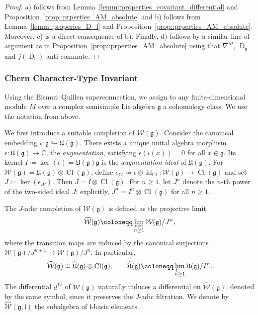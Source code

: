 \documentclass[11pt]{amsart}
\newcommand{\id}{\operatorname{id}}
\newcommand{\Dirac}{\operatorname{D}}
\def\WW{{\mathcal{W}}}
\def\Weil{{\mathcal{W}(\gg)}}
\def\CC{{\mathbb C}}
\def\Cl{{\operatorname{Cl}}}
\def\ll{{\mathfrak l}}
\def\gg{{\mathfrak{g}}}
\def\UE{{\mathfrak U}}
\theoremstyle{plain}
\theoremstyle{remark}
\theoremstyle{definition}
\numberwithin{equation}{section}
\theoremstyle{remark}
\begin{document}
\begin{proof}
 a) follows from Lemma~\ref{lemm::properties_covariant_differential} and Proposition~\ref{prop::prperties_AM_absolute} and b) follows from Lemma~\ref{lemm::properies_D_l} and Proposition~\ref{prop::prperties_AM_absolute}. Moreover, c) is a direct consequence of b). Finally, d) follows by a similar line of argument as in Proposition~\ref{prop::prperties_AM_absolute} using that $\nabla^{M}$, $\Dirac_{\gg}$ and $j(\Dirac_{\ll})$ anti-commute. 
\end{proof}

\subsubsection{Chern Character-Type Invariant} Using the Bismut--Quillen superconnection, we assign to any finite-dimensional module $M$ over a complex semisimple Lie algebra $\gg$ a cohomology class. We use the notation from above.


We first introduce a suitable completion of $\Weil$. Consider the canonical
embedding $\iota:\gg\hookrightarrow\UE(\gg)$. There exists a unique unital algebra
morphism $\epsilon:\UE(\gg)\to\CC$, the \emph{augmentation}, satisfying
$\epsilon(\iota(x))=0$ for all $x\in\gg$. Its kernel
$
I\coloneqq \ker(\epsilon)=\UE(\gg)\gg
$
is the \emph{augmentation ideal} of $\UE(\gg)$. For $\Weil=\UE(\gg)\otimes\Cl(\gg)$, define
$\epsilon_{\WW}\coloneqq \epsilon\otimes\id_{\Cl}:\Weil\to\Cl(\gg)$ and set
$J\coloneqq \ker(\epsilon_{\WW})$. Then $J=I\otimes\Cl(\gg)$. For $n\ge1$, let $J^{n}$
denote the $n$-th power of the two-sided ideal $J$; explicitly,
$J^{n}=I^{n}\otimes\Cl(\gg)$ for all $n\ge1$.

The $J$-adic completion of $\Weil$ is defined as the projective limit
\begin{equation}
\widehat{\WW}(\gg)\coloneqq \varprojlim_{n\ge1}\Weil/J^{n},
\end{equation}
where the transition maps are induced by the canonical surjections
$\Weil/J^{n+1}\to\Weil/J^{n}$. In particular,
\begin{equation}
\widehat{\WW}(\gg)\cong\widehat{\UE}(\gg)\otimes\Cl(\gg),
\qquad
\widehat{\UE}(\gg)\coloneqq \varprojlim_{n\ge1}\UE(\gg)/I^{n}.
\end{equation}
The differential $d^{\WW}$ of $\Weil$ naturally induces a differential on $\widehat{\WW}(\gg)$, denoted by the same symbol, since it preserves the $J$-adic filtration. We denote by $\widehat{\WW}(\gg,\ll)$ the subalgebra of $\ll$-basic elements.
\end{document}
